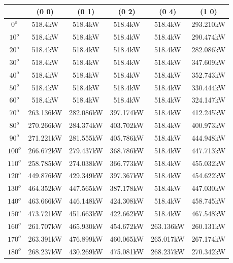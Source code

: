         \singlespacing
        \begin{table}[H]
        	\centering
        	\begin{tabular}{|c|c|c|c|c|c|} \hline
        			& (0 0)		& (0 1)		& (0 2)		& (0 4)		& (1 0)		\\ \hline
        		$0^o$	& 518.4kW	& 518.4kW	& 518.4kW	& 518.4kW	& 293.210kW	\\ \hline
        		$10^o$	& 518.4kW	& 518.4kW	& 518.4kW	& 518.4kW	& 290.474kW	\\ \hline
        		$20^o$	& 518.4kW	& 518.4kW	& 518.4kW	& 518.4kW	& 282.086kW	\\ \hline
        		$30^o$	& 518.4kW	& 518.4kW	& 518.4kW	& 518.4kW	& 347.609kW	\\ \hline
        		$40^o$	& 518.4kW	& 518.4kW	& 518.4kW	& 518.4kW	& 352.743kW	\\ \hline
        		$50^o$	& 518.4kW	& 518.4kW	& 518.4kW	& 518.4kW	& 330.444kW	\\ \hline
        		$60^o$	& 518.4kW	& 518.4kW	& 518.4kW	& 518.4kW	& 324.147kW	\\ \hline
        		$70^o$	& 263.136kW	& 282.086kW	& 397.174kW	& 518.4kW	& 412.245kW	\\ \hline
        		$80^o$	& 270.266kW	& 284.374kW	& 403.702kW	& 518.4kW	& 400.973kW	\\ \hline
        		$90^o$	& 271.221kW	& 281.555kW	& 405.786kW	& 518.4kW	& 444.948kW	\\ \hline
        		$100^o$	& 266.672kW	& 279.437kW	& 368.786kW	& 518.4kW	& 447.713kW	\\ \hline
        		$110^o$	& 258.785kW	& 274.038kW	& 366.773kW	& 518.4kW	& 455.032kW	\\ \hline
        		$120^o$	& 449.876kW	& 429.349kW	& 397.367kW	& 518.4kW	& 454.622kW	\\ \hline
        		$130^o$	& 464.352kW	& 447.565kW	& 387.178kW	& 518.4kW	& 447.030kW	\\ \hline
        		$140^o$	& 463.666kW	& 446.148kW	& 424.308kW	& 518.4kW	& 458.745kW	\\ \hline
        		$150^o$	& 473.721kW	& 451.663kW	& 422.662kW	& 518.4kW	& 467.548kW	\\ \hline
        		$160^o$	& 261.707kW	& 465.930kW	& 454.672kW	& 263.136kW	& 260.131kW	\\ \hline
        		$170^o$	& 263.391kW	& 476.899kW	& 460.065kW	& 265.017kW	& 267.174kW	\\ \hline
        		$180^o$	& 268.237kW	& 430.269kW	& 475.081kW	& 268.237kW	& 270.342kW	\\ \hline

\end{tabular}
\end{table}
